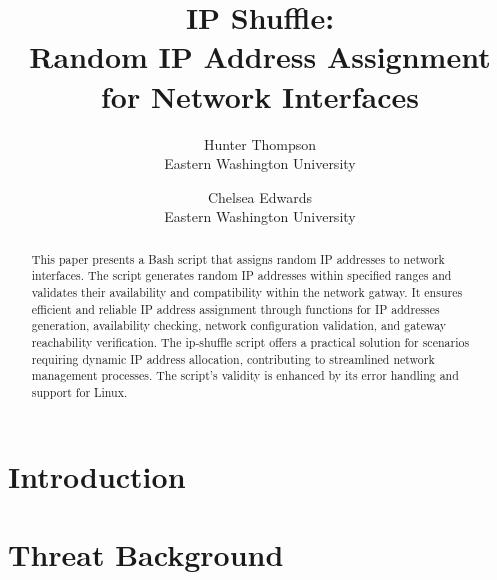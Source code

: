 \documentclass[letterpaper,twocolumn,10pt]{article}
\begin{document}

\date{}

\title{\Large \bf IP Shuffle:\\
  Random IP Address Assignment for Network Interfaces}

\author{
{\rm Hunter Thompson}\\
Eastern Washington University
\and
{\rm Chelsea Edwards}\\
Eastern Washington University
} %

\maketitle

\begin{abstract}
This paper presents a Bash script that assigns random IP addresses to network 
interfaces. The script generates random IP addresses within specified ranges 
and validates their availability and compatibility within the network gatway. It 
ensures efficient and reliable IP address assignment through functions for IP 
addresses generation, availability checking, network configuration validation, and 
gateway reachability verification. The ip-shuffle script offers a practical solution
for scenarios requiring dynamic IP address allocation, contributing to streamlined
network management processes. The script's validity is enhanced by its error handling 
and support for Linux. 
\end{abstract}


\section{Introduction}


\section{Threat Background}

\end{document}
